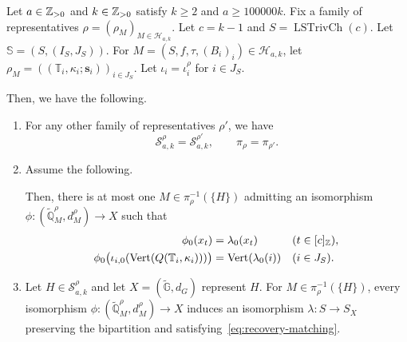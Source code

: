 \begin{lemma}\label{lem:marked-chain-recovery}
Let $a\in\mathbb Z_{>0}$ and $k\in\mathbb Z_{>0}$ satisfy $k\ge2$ and $a\ge100000k$.
Fix a family of representatives $\rho=(\rho_M)_{M\in\mathcal H_{a,k}}$.
Let $c=k-1$ and $S=\operatorname{LSTrivCh}(c)$.
Let $\mathbb S=(S,(I_S,J_S))$.
For $M=(S,f,\tau,(B_i)_i)\in\mathcal H_{a,k}$, let
$\rho_M=((\mathbb T_i,\kappa_i;\mathbf s_i))_{i\in J_S}$.
Let $\iota_i=\iota_i^\rho$ for $i\in J_S$.

Then, we have the following.
\begin{enumerate}
\item\label{c:marked-representative-independence} For any other family of representatives $\rho'$, we have
\[
 \mathcal S_{a,k}^\rho=\mathcal S_{a,k}^{\rho'},\qquad
 \pi_\rho=\pi_{\rho'}.
\]
\item\label{c:marked-recovery-unique} Assume the following.
Then, there is at most one $M\in\pi_\rho^{-1}(\{H\})$ admitting an isomorphism
$\phi:(\widetilde{\mathbb Q}_M^\rho,d_M^\rho)\to X$ such that
\begin{equation}\label{eq:recovery-matching}
\begin{aligned}
 \phi_0(x_t)&=\lambda_0(x_t)&& (t\in[c]_{\mathbb Z}),\\
 \phi_0\bigl(\iota_{i,0}(\operatorname{Vert}(Q(\mathbb T_i,\kappa_i)))\bigr)
 &=\operatorname{Vert}(\lambda_0(i))&& (i\in J_{S}).
\end{aligned}
\end{equation}
\item\label{c:marked-recovery-skeleton} Let $H\in\mathcal S_{a,k}^\rho$ and let $X=(\widetilde{\mathbb G},d_G)$ represent $H$.
For $M\in\pi_\rho^{-1}(\{H\})$, every isomorphism
$\phi:(\widetilde{\mathbb Q}_M^\rho,d_M^\rho)\to X$
induces an isomorphism $\lambda:S\to S_X$ preserving the bipartition and satisfying~\eqref{eq:recovery-matching}.
\end{enumerate}
\end{lemma}

